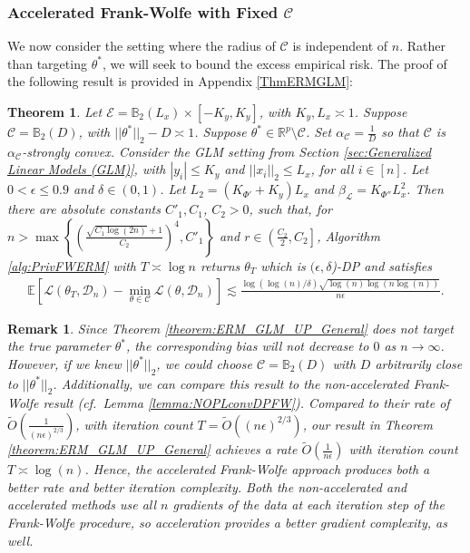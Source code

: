 \documentclass{article}
\newtheorem{theorem}{Theorem}
\newtheorem{remark}{\textbf{Remark}}
\begin{document}

\subsubsection{Accelerated Frank-Wolfe with Fixed $\mathcal{C}$}
\label{sec:Fixed C and the Lower Bound}

We now consider the setting where the radius of $\mathcal{C}$ is independent of $n$. Rather than targeting $\theta^*$, we will seek to bound the excess empirical risk. The proof of the following result is provided in Appendix \ref{ThmERMGLM}:

\begin{theorem}
\label{theorem:ERM_GLM_UP}
Let $\mathcal{E} = \mathbb{B}_2(L_x)\times [-K_y, K_y]$, with $K_y, L_x \asymp 1$. Suppose $\mathcal{C} = \mathbb{B}_{2}\left(D\right)$, with $||\theta^*||_2 - D \asymp 1$. Suppose $\theta^* \in \mathbb{R}^p \setminus \mathcal{C}$. Set $\alpha_{\mathcal{C}} = \frac{1}{D}$ so that $\mathcal{C}$ is $\alpha_{\mathcal{C}}$-strongly convex. Consider the GLM setting from Section \ref{sec:Generalized Linear Models (GLM)}, with $|y_i| \leq K_y$ and $||x_i||_2 \leq L_x$, for all $i \in [n]$. Let $0 < \epsilon \le 0.9$ and $\delta \in (0, 1)$. Let $L_2 = (K_{\Phi'} + K_y)L_x$ and $\beta_{\mathcal{L}} = K_{\Phi''}L_x^2$. Then there are absolute constants $C'_1, C_1$, $C_2 > 0$, such that, for $n > \max\left\{\left(\frac{\sqrt{C_1\log(2n)} + 1}{C_2}\right)^{4}, C'_1\right\}$ and $r \in\left(\frac{C_2}{2}, C_2\right]$, Algorithm \ref{alg:PrivFWERM} with $T \asymp \log n$
returns $\theta_T$ which is $(\epsilon, \delta$)-DP and satisfies
\begin{align*}
\mathbb{E}\left[\mathcal{L}(\theta_T, \mathcal{D}_n) - \mathop{\min}\limits_{\theta \in \mathcal{C}}\mathcal{L}(\theta, \mathcal{D}_n)\right] \lesssim \frac{\log\left(\log(n)/\delta\right)\sqrt{\log(n)\log\left(n\log(n)\right)}}{n\epsilon}.
\end{align*}
\end{theorem}

\begin{remark}
\label{remark:More_General_C_ERM}
Since Theorem \ref{theorem:ERM_GLM_UP_General} does not target the true parameter $\theta^*$, the corresponding bias will not decrease to $0$ as $n \rightarrow \infty$. However, if we knew $||\theta^*||_2$, we could choose $\mathcal{C} = \mathbb{B}_2(D)$ with $D$ arbitrarily close to $||\theta^*||_2$.
Additionally, we can compare this result to the non-accelerated Frank-Wolfe result (cf.\ Lemma \ref{lemma:NOPLconvDPFW}). Compared to their rate of $\widetilde{O}\left(\frac{1}{(n\epsilon)^{2/3}}\right)$, with iteration count $T = \widetilde{O}\left((n\epsilon)^{2/3}\right)$, our  result in Theorem \ref{theorem:ERM_GLM_UP_General} achieves a rate $\widetilde{O}\left(\frac{1}{n\epsilon}\right)$ with iteration count $T \asymp \log(n)$. Hence, the accelerated Frank-Wolfe approach produces both a better rate and better iteration complexity. Both the non-accelerated and accelerated methods use all $n$ gradients of the data at each iteration step of the Frank-Wolfe procedure, so acceleration provides a better gradient complexity, as well.
\end{remark}
\end{document}
